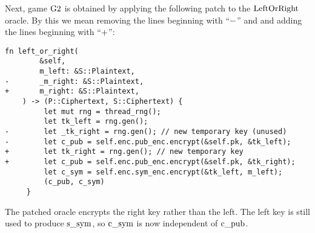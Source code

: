 Next, game $\code{G2}$ is obtained by applying the following patch to the
$\code{LeftOrRight}$ oracle. By this we mean removing the lines beginning with
``$\code{-}$'' and and adding the lines beginning with ``$\code{+}$'':
%
\begin{lstlisting}[style=patch]
    fn left_or_right(
        &self,
        m_left: &S::Plaintext,
-       _m_right: &S::Plaintext,
+       m_right: &S::Plaintext,
    ) -> (P::Ciphertext, S::Ciphertext) {
         let mut rng = thread_rng();
         let tk_left = rng.gen();
-        let _tk_right = rng.gen(); // new temporary key (unused)
-        let c_pub = self.enc.pub_enc.encrypt(&self.pk, &tk_left);
+        let tk_right = rng.gen(); // new temporary key
+        let c_pub = self.enc.pub_enc.encrypt(&self.pk, &tk_right);
         let c_sym = self.enc.sym_enc.encrypt(&tk_left, m_left);
         (c_pub, c_sym)
     }
\end{lstlisting}
%
The patched oracle encrypts the right key rather than the left. The left key is
still used to produce $\code{s_sym}$, so $\code{c_sym}$ is now independent of
$\code{c_pub}$.

